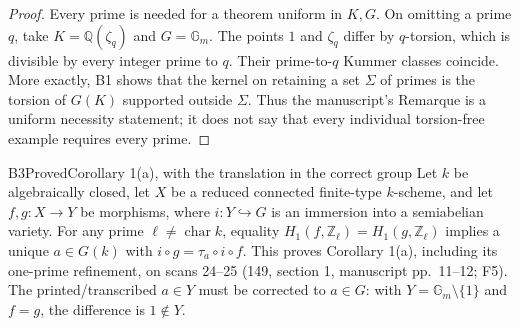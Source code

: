 \begin{proof}
Every prime is needed for a theorem uniform in $K,G$. On omitting a
prime $q$, take $K=\mathbb Q(\zeta_q)$ and $G=\mathbb G_m$.
The points $1$ and $\zeta_q$ differ by $q$-torsion, which is divisible by
every integer prime to $q$. Their prime-to-$q$ Kummer classes coincide.
More exactly, B1 shows that the kernel on retaining a set $\Sigma$ of
primes is the torsion of $G(K)$ supported outside $\Sigma$. Thus the
manuscript's Remarque is a uniform necessity statement; it does not say
that every individual torsion-free example requires every prime.
\end{proof}


\begin{result}{B3}{Proved}{Corollary 1(a), with the translation in the correct group}
\label{res:B3}
Let $k$ be algebraically closed, let $X$ be a reduced connected
finite-type $k$-scheme, and let $f,g:X\to Y$ be morphisms, where
$i:Y\hookrightarrow G$ is an immersion into a semiabelian variety.
For any prime $\ell\ne\operatorname{char}k$, equality
$H_1(f,\mathbb Z_\ell)=H_1(g,\mathbb Z_\ell)$ implies a unique
$a\in G(k)$ with $i\circ g=\tau_a\circ i\circ f$.
This proves Corollary 1(a), including its one-prime refinement, on
scans 24--25 (149, section 1, manuscript pp.~11--12; F5).
The printed/transcribed $a\in Y$ must be corrected to $a\in G$:
with $Y=\mathbb G_m\setminus\{1\}$ and $f=g$, the difference is
$1\notin Y$.
\end{result}
